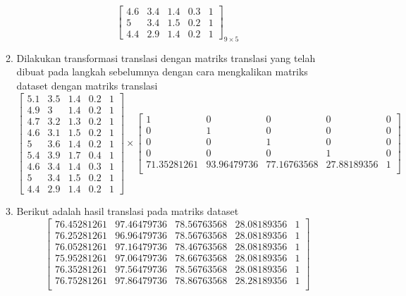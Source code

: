 \documentclass[a4paper,twoside]{article}
\begin{document}
\begin{enumerate}
\begin{enumerate}
\[\begin{bmatrix}
					4.6		&		3.4		&		1.4		&		0.3		&		1 \\
					5		&		3.4		&		1.5		&		0.2		&		1 \\
					4.4		&		2.9		&		1.4		&		0.2		&		1
				\end{bmatrix}_{9\times 5}
			\]
			\item Dilakukan transformasi translasi dengan matriks translasi yang telah dibuat pada langkah sebelumnya dengan cara mengkalikan matriks dataset dengan matriks translasi
			\[
				\begin{bmatrix}
					5.1		&		3.5		&		1.4		&		0.2		&		1 \\
					4.9		&		3		&		1.4		&		0.2		&		1 \\
					4.7		&		3.2		&		1.3		&		0.2		&		1 \\
					4.6		&		3.1		&		1.5		&		0.2		&		1 \\
					5		&		3.6		&		1.4		&		0.2		&		1 \\
					5.4		&		3.9		&		1.7		&		0.4		&		1 \\
					4.6		&		3.4		&		1.4		&		0.3		&		1 \\
					5		&		3.4		&		1.5		&		0.2		&		1 \\
					4.4		&		2.9		&		1.4		&		0.2		&		1
				\end{bmatrix} 
				\times
				\begin{bmatrix}
					1				&		0				&		0				&		0				&		0 \\
					0				&		1				&		0				&		0				&		0 \\
					0				&		0				&		1				&		0				&		0 \\
					0				&		0				&		0				&		1				&		0 \\
					71.35281261		&		93.96479736		&		77.16763568		&		27.88189356		&		1 \\
				\end{bmatrix} 
			\]
			\item Berikut adalah hasil translasi pada matriks dataset
			\[
				\begin{bmatrix}
					76.45281261  & 97.46479736 &  78.56763568 &  28.08189356 & 1 \\
					76.25281261  & 96.96479736 &  78.56763568 &  28.08189356 & 1 \\
					76.05281261  & 97.16479736 &  78.46763568 &  28.08189356 & 1 \\
					75.95281261  & 97.06479736 &  78.66763568 &  28.08189356 & 1 \\
					76.35281261  & 97.56479736 &  78.56763568 &  28.08189356 & 1 \\
					76.75281261  & 97.86479736 &  78.86763568 &  28.28189356 & 1 \\

\end{bmatrix}\]
\end{enumerate}
\end{enumerate}
\end{document}
